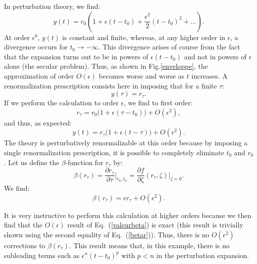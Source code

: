 \documentclass[floatfix,twocolumn,preprintnumbers,amsmath,amssymb,prb]{revtex4}
\begin{document}
{{In perturbation theory, we find:
\begin{equation}
y(t)= r_0 (1+\epsilon(t-t_0) +\frac{\epsilon^2}{2}(t-t_0)^2
+\dots).
\label{approx_ordre_eps}
\end{equation}
At order $\epsilon^0$, $y(t)$ is constant and finite, whereas, at
any higher order in $\epsilon$, a divergence occurs for
$t_0\to-\infty$. This divergence arises of course from the fact
that the expansion turns out to be in powers of 
$\epsilon(t-t_0)$ and not in powers of $\epsilon$ alone (the
secular problem). Thus, as shown in Fig.\ref{enveloppe}, the
approximation of order
$O(\epsilon)$ becomes worse and worse as
$t$ increases. A renormalization prescription consists here in
imposing that for a finite $\tau$:
\begin{equation}
y(\tau)=r_\tau.
\label{tauprescription}
\end{equation}
If we perform the calculation to order $\epsilon$, we find to
first order:
\begin{equation}
r_\tau= r_0\big(1+\epsilon(\tau-t_0)\big) +O(\epsilon^2),
\label{rtau}
\end{equation}
and thus, as expected:
\begin{equation}
y(t)=r_\tau\big(1+\epsilon(t-\tau)\big) +O(\epsilon^2).
\label{yrtau}
\end{equation}
The theory is perturbatively renormalizable at this order because by imposing a
single renormalization prescription, it is possible to completely
eliminate
$t_0$ and $r_0$.
Let us define the $\beta$-function for $r_\tau$ by:
\begin{equation}
\beta(r_\tau) = \frac{\partial
r_\tau}{\partial\tau}\bigg|_{r_0,t_0}=\frac{\partial f}{\partial
\zeta}(r_\tau,\zeta)\bigg|_{\zeta=0}.
\label{betar}
\end{equation}
We find:
\begin{equation}
\beta(r_\tau) = \epsilon r_\tau +O(\epsilon^2).
\label{valeurbeta}
\end{equation}

It is very instructive to perform this calculation at higher
orders because we then find that the $O(\epsilon)$ result of
Eq.~(\ref{valeurbeta}) is exact (this result is trivially shown
using the second equality of Eq.~(\ref{betar})). Thus, there is no
$O(\epsilon^2)$ corrections to $\beta(r_\tau)$. This result means that, in this example, there is no subleading terms
such as
$\epsilon^n (t-t_0)^p$ with $p<n$ in the perturbation expansion.

}}
\end{document}
